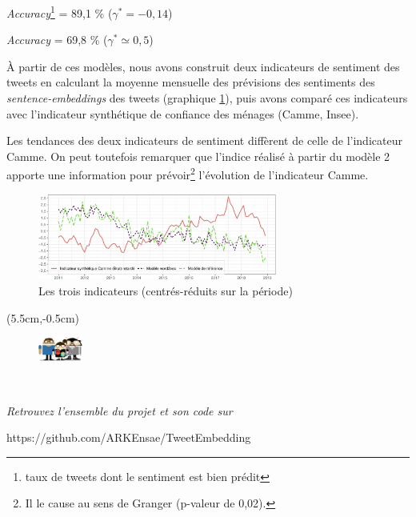\documentclass[10pt,french,french]{article}
\let\rmarkdownfootnote\footnote%
\def\footnote{\protect\rmarkdownfootnote}
\begin{document}
\begin{multicols}{2}
\faArrowCircleRight{} \emph{Accuracy}\footnote{taux de tweets dont le sentiment est bien prédit} =  89,1 \% ($\gamma^* = -0,14$) 

\faArrowCircleRight{} \emph{Accuracy} =  69,8 \% ($\gamma^* \simeq 0,5$) 

 \end{multicols}

À partir de ces modèles, nous avons construit deux indicateurs de sentiment des tweets en calculant la moyenne mensuelle des prévisions des sentiments des \emph{sentence-embeddings} des tweets (graphique \ref{fig:bslogcam}), puis avons comparé ces indicateurs avec l'indicateur synthétique de confiance des ménages (Camme, Insee).

Les tendances des deux indicateurs de sentiment diffèrent de celle de l'indicateur Camme. On peut toutefois remarquer que l'indice réalisé à partir du modèle 2 apporte une information pour prévoir\footnote{Il le cause au sens de Granger (p-valeur de 0,02).} l'évolution de l'indicateur Camme.

\begin{figure}[htp]
\begin{center}
\includegraphics[width =0.7\textwidth]{img/rmd-graphSentiments-1}
\captionsetup{margin=0cm,format=hang,justification=justified}
\caption{Les trois indicateurs (centrés-réduits sur la période)}\label{fig:bslogcam}
\end{center}
\end{figure}

\begin{textblock*}{\textwidth}(5.5cm,-0.5cm)
\begin{center}
\begin{minipage}{0.7\textwidth}

\begin{figure}
\includegraphics[height=0.8cm]{img/avatars.png}
\end{figure}

$\phantom{saut}$

\emph{Retrouvez l'ensemble du projet et son code sur}

https://github.com/ARKEnsae/TweetEmbedding

\end{minipage}
\end{center}

\end{textblock*}
\end{document}
